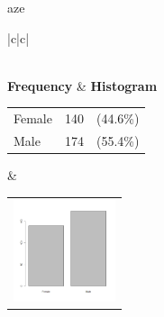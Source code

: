 \begin{center}
\begin{tabular}{|c|c|c|c|}
    \end{tabular}
  \end{center}
  
  



 aze 
  \begin{center}
    \addtolength{\leftskip}{-4cm}\addtolength{\rightskip}{-4cm}
    \begin{tabular}{|c|c|}

      \hline
        \\
      \hline
        {\bf Frequency} & {\bf Histogram}  \\
          \begin{tabular}{@{}l@{ : }cl@{}}
            Female & 140 &(44.6\%) \\
            Male & 174 &(55.4\%) \\
          \end{tabular}
      &
          \begin{tabular}{@{}l@{}}
            \includegraphics[width=3cm]{graphUniv/V3-barplot}
          \end{tabular}
      \\ \hline 

    \end{tabular}
  \end{center}
  
  



